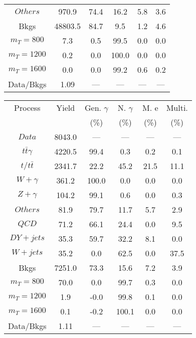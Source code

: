 \begin{figure}
\begin{minipage}[c]{0.32\textwidth}
{\begin{tabular}{cccccc}
$ Others $ &  970.9 &  74.4 &  16.2 &  5.8 &  3.6\\
Bkgs &  48803.5 &  84.7 &  9.5 &  1.2 &  4.6\\
$ m_{T} = 800 $ &  7.3 &  0.5 &  99.5 &  0.0 &  0.0\\
$ m_{T} = 1200 $ &  0.2 &  0.0 &  100.0 &  0.0 &  0.0\\
$ m_{T} = 1600 $ &  0.0 &  0.0 &  99.2 &  0.6 &  0.2\\
Data/Bkgs &  1.09 &  --- &  --- &  --- &  ---\\
\hline
\end{tabular}
}
\end{minipage}
\begin{minipage}[c]{0.32\textwidth}
\centering
\tiny{
\begin{tabular}{cccccc}
\hline
Process & Yield & Gen. $\gamma$ & N. $\gamma$ & M. e & Multi. \\
 &  & (\%) & (\%) & (\%) & (\%)  \\
\hline
                                                                      $ Data $ &  8043.0 &  --- &  --- &  --- &  ---\\
$ t\bar{t}\gamma $ &  4220.5 &  99.4 &  0.3 &  0.2 &  0.1\\
$ t/t\bar{t} $ &  2341.7 &  22.2 &  45.2 &  21.5 &  11.1\\
$ W+\gamma $ &  361.2 &  100.0 &  0.0 &  0.0 &  0.0\\
$ Z+\gamma $ &  104.2 &  99.1 &  0.6 &  0.0 &  0.3\\
$ Others $ &  81.9 &  79.7 &  11.7 &  5.7 &  2.9\\
$ QCD $ &  71.2 &  66.1 &  24.4 &  0.0 &  9.5\\
$ DY+jets $ &  35.3 &  59.7 &  32.2 &  8.1 &  0.0\\
$ W+jets $ &  35.2 &  0.0 &  62.5 &  0.0 &  37.5\\
Bkgs &  7251.0 &  73.3 &  15.6 &  7.2 &  3.9\\
$ m_{T} = 800 $ &  70.0 &  0.0 &  99.7 &  0.3 &  0.0\\
$ m_{T} = 1200 $ &  1.9 &  -0.0 &  99.8 &  0.1 &  0.0\\
$ m_{T} = 1600 $ &  0.1 &  -0.2 &  100.1 &  0.0 &  0.0\\
Data/Bkgs &  1.11 &  --- &  --- &  --- &  ---\\
\hline
\end{tabular}
}
\end{minipage}
\begin{minipage}[c]{0.32\textwidth}
\centering
\tiny{
}
\end{minipage}
\end{figure}
